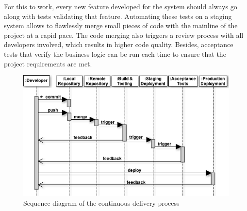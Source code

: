 For this to work, every new feature developed for the system should always go along with tests validating that feature. Automating these tests on a staging system allows to flawlessly merge small pieces of code with the mainline of the project at a rapid pace. The code merging also triggers a review process with all developers involved, which results in higher code quality. Besides, acceptance tests that verify the business logic can be run each time to ensure that the project requirements are met.

\begin{figure}[!h]
\center
\includegraphics[keepaspectratio, width=15cm]{sequence-diagrams/cd-process.png}
\caption{Sequence diagram of the continuous delivery process}
\label{cd-process}
\end{figure}